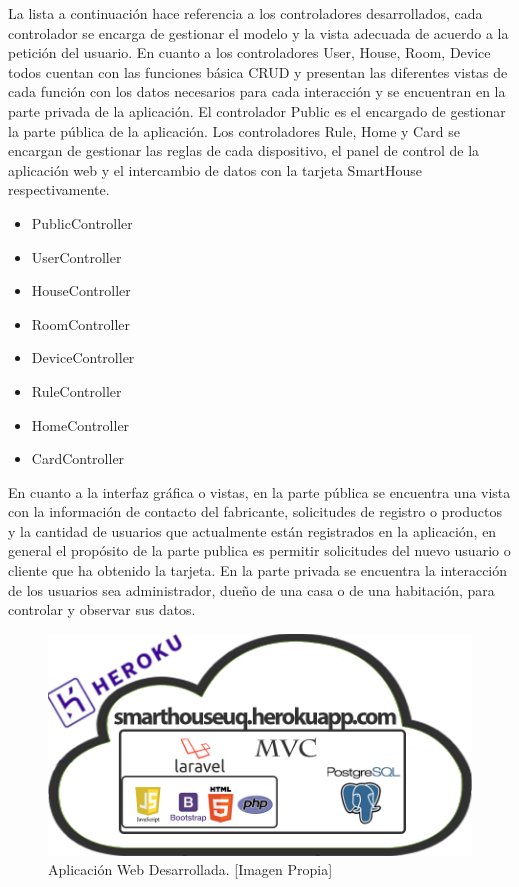 La lista a continuación hace referencia a los controladores desarrollados, cada controlador se encarga de gestionar el modelo y la vista adecuada de acuerdo a la petición del usuario. En cuanto a los controladores User, House, Room, Device todos cuentan con las funciones básica CRUD y presentan las diferentes vistas de cada función con los datos necesarios para cada interacción y se encuentran en la parte privada de la aplicación. El controlador Public es el encargado de gestionar la parte pública de la aplicación. Los controladores Rule, Home y Card se encargan de gestionar las reglas de cada dispositivo, el panel de control de la aplicación web y el intercambio de datos con la tarjeta SmartHouse respectivamente.\\

\begin{itemize}
	\item PublicController
	\item UserController
	\item HouseController
	\item RoomController
	\item DeviceController
	\item RuleController
	\item HomeController
	\item CardController
\end{itemize}

En cuanto a la interfaz gráfica o vistas, en la parte pública se encuentra una vista con la información de contacto del fabricante, solicitudes de registro o productos y la cantidad de usuarios que actualmente están registrados en la aplicación, en general el propósito de la parte publica es permitir solicitudes del nuevo usuario o cliente que ha obtenido la tarjeta. En la parte privada se encuentra la interacción de los usuarios sea administrador, dueño de una casa o de una habitación, para controlar y observar sus datos.\\

\begin{figure}[H]
	\centering
	\caption[Aplicación Web Desarrollada.]{Aplicación Web Desarrollada. [Imagen Propia]}
	\label{fig:B_appweb}
	\includegraphics[width=0.5\linewidth]{Imagenes/B_ImplAPPweb}
\end{figure}

